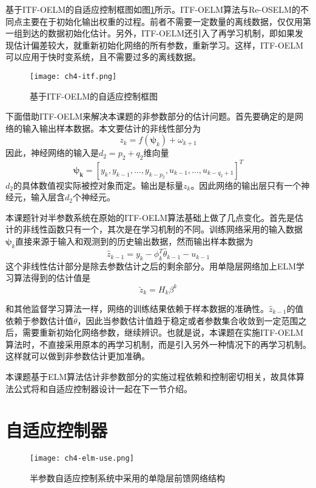 基于ITF-OELM的自适应控制框图如图\ref{fig.itf-oelm}所示。ITF-OELM算法与Re-OSELM的不同点主要在于初始化输出权重的过程。前者不需要一定数量的离线数据，仅仅用第一组到达的数据初始化估计。另外，ITF-OELM还引入了再学习机制，即如果发现估计偏差较大，就重新初始化网络的所有参数，重新学习。这样，ITF-OELM可以应用于快时变系统，且不需要过多的离线数据。
\begin{figure}[!htb]
  \centering
  \texttt{[image: ch4-itf.png]}\\	 %
  \caption{基于ITF-OELM的自适应控制框图}
  \label{fig.itf-oelm}
\end{figure}

下面借助ITF-OELM来解决本课题的非参数部分的估计问题。首先要确定的是网络的输入输出样本数据。本文要估计的非线性部分为
\begin{equation}
z_{k} = f(\bm{\psi}_{k}) + \omega_{k+1}
\end{equation}
因此，神经网络的输入是$d_{2}=p_{2}+q_{2}$维向量
$$\bm{\psi_{k}}=[y_{k},y_{k-1},\ldots,y_{k-p_{2}},u_{k-1},\dots,u_{k-q_{2}+1}]^{T}$$
$d_{2}$的具体数值视实际被控对象而定。输出是标量$z_{k}$。因此网络的输出层只有一个神经元，输入层含$d_{2}$个神经元。

本课题针对半参数系统在原始的ITF-OELM算法基础上做了几点变化。首先是估计的非线性函数只有一个，其次是在学习机制的不同。训练网络采用的输入数据$\bm{\psi}_{k}$直接来源于输入和观测到的历史输出数据，然而输出样本数据为
\begin{equation}\label{eq:4.hatz}
\hat{z}_{k-1}=y_{k}-\phi_{k}^{T}\hat{\theta}_{k-1}-u_{k-1}
\end{equation}
这个非线性估计部分是除去参数估计之后的剩余部分。用单隐层网络加上ELM学习算法得到的估计值是
\begin{equation}\label{eq:4.z.breave}
\breve{z}_{k}=H_{k}\beta^{k}
\end{equation}

和其他监督学习算法一样，网络的训练结果依赖于样本数据的准确性。$\hat{z}_{k-1}$的值依赖于参数估计值$\hat{\theta}$，因此当参数估计值趋于稳定或者参数集合收敛到一定范围之后，需要重新初始化网络参数，继续辨识。也就是说，本课题在实施ITF-OELM算法时，不直接采用原本的再学习机制，而是引入另外一种情况下的再学习机制。这样就可以做到非参数估计更加准确。

本课题基于ELM算法估计非参数部分的实施过程依赖和控制密切相关，故具体算法公式将和自适应控制器设计一起在下一节介绍。

\section{自适应控制器}\label{sect:4.3}
\begin{figure}[!htb]
  \centering
  \texttt{[image: ch4-elm-use.png]}\\	 %
  \caption{半参数自适应控制系统中采用的单隐层前馈网络结构}
  \label{fig.elm.use}
\end{figure}

